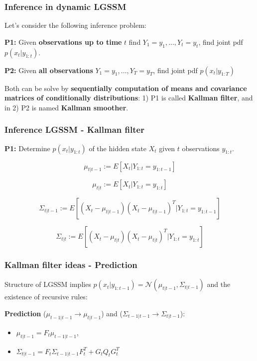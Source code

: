 \documentclass[xcolor=dvipsnames, compress]{beamer}
\begin{document}
\begin{frame}
\frametitle{Inference in dynamic LGSSM}

Let's consider the following inference problem:

\textbf{P1:} Given \textbf{observations up to time} $t$ find $Y_1=y_1, \ldots, Y_t=y_t$, find joint pdf $p(x_t|y_{1:t})$.\vspace{0.5cm}

\textbf{P2:} Given \textbf{all observations} $Y_1=y_1, \ldots, Y_T=y_T$, find joint pdf $p(x_t|y_{1:T})$\vspace{0.5cm}

Both can be solve by \textbf{sequentially computation of means  and  covariance  matrices of conditionally distributions}: 1)  P1 is called \textbf{Kallman filter}, and in 2) P2 is named \textbf{Kallman smoother}.
\end{frame}

\begin{frame}
\frametitle{Inference LGSSM - Kallman filter}

\textbf{P1:} Determine $p(x_t|y_{1:t})$ of the hidden state $X_t$ given $t$ observations $y_{1:t}$. 

\begin{equation}
\mu_{t|t-1}:= E[X_t | Y_{1:t} = y_{1:t-1} ]
\end{equation}

\begin{equation}
\mu_{t|t}:= E[X_t | Y_{1:t} = y_{1:t} ]
\end{equation}

\begin{equation}
\Sigma_{t|t-1}:= E[(X_t -\mu_{t|t-1}) (X_t -\mu_{t|t-1})^T | Y_{1:t} = y_{1:t-1} ]
\end{equation}

\begin{equation}
\Sigma_{t|t}:= E[(X_t -\mu_{t|t}) (X_t -\mu_{t|t})^T | Y_{1:t} = y_{1:t} ]
\end{equation}

\end{frame}

\begin{frame}
\frametitle{Kallman filter ideas - Prediction}

Structure of LGSSM implies $p(x_t| y_{1:t-1})=\mathcal{N}( \mu_{t|t-1}, \Sigma_{t|t-1}  )$ and the existence of recursive rules: \vspace{0.5cm}

\textbf{Prediction} ($\mu_{t-1|t-1} \rightarrow \mu_{t|t-1} $) and ($\Sigma_{t-1|t-1} \rightarrow \Sigma_{t|t-1} $):
\begin{itemize}
	\item $\mu_{t|t-1} = F_t \mu_{t-1|t-1}$, 
	\item $\Sigma_{t|t-1} = F_t \Sigma_{t-1|t-1} F_t^T+ G_t Q_t G_t^T$
\end{itemize}

\end{frame}
\end{document}
